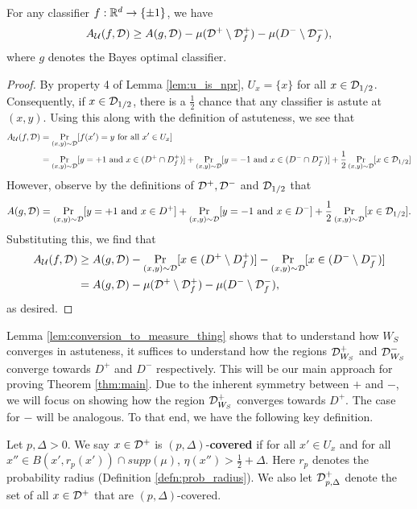 \begin{lem}\label{lem:conversion_to_measure_thing}
For any classifier $f: \mathbb R^d \to \{\pm 1\}$, we have $$A_{\mathcal U}(f, {\mathcal D}) \geq A(g, {\mathcal D}) - \mu({\mathcal D}^+ \setminus {\mathcal D}_f^+) - \mu(D^- \setminus {\mathcal D}_f^-),$$ where $g$ denotes the Bayes optimal classifier.
\end{lem}

\begin{proof}
By property 4 of Lemma \ref{lem:u_is_npr}, $U_x = \{x\}$ for all $x \in {\mathcal D}_{1/2}$. Consequently, if $x \in {\mathcal D}_{1/2}$, there is a $\frac{1}{2}$ chance that any classifier is astute at $(x,y)$. Using this along with the definition of astuteness, we see that 
\begin{equation*}
\begin{split}
A_{\mathcal U}(f, {\mathcal D}) &= \Pr_{(x,y) \sim {\mathcal D}} [f(x') = y\text{ for all }x' \in U_x] \\
&= \Pr_{(x,y) \sim {\mathcal D}}[y = +1\text{ and }x \in (D^+ \cap D_f^+)] + \Pr_{(x,y) \sim {\mathcal D}}[y = -1\text{ and }x \in (D^- \cap D_f^-)] + \frac{1}{2}\Pr_{(x,y) \sim {\mathcal D}}[x \in {\mathcal D}_{1/2}]
\end{split}
\end{equation*}
However, observe by the definitions of ${\mathcal D}^+, {\mathcal D}^-$ and ${\mathcal D}_{1/2}$ that $$A(g, {\mathcal D}) = \Pr_{(x,y) \sim {\mathcal D}}[y = +1\text{ and }x \in D^+] + \Pr_{(x,y) \sim {\mathcal D}}[y = -1\text{ and }x \in D^-] + \frac{1}{2}\Pr_{(x,y) \sim {\mathcal D}}[x \in {\mathcal D}_{1/2}].$$ Substituting this, we find that 
\begin{equation*}
\begin{split}
A_{\mathcal U}(f, {\mathcal D}) &\geq A(g, {\mathcal D}) - \Pr_{(x,y) \sim {\mathcal D}}[x \in (D^+ \setminus D_f^+)] - \Pr_{(x,y) \sim {\mathcal D}}[x \in (D^- \setminus D_f^-)] \\
&= A(g, {\mathcal D}) - \mu({\mathcal D}^+ \setminus {\mathcal D}_f^+) - \mu(D^- \setminus {\mathcal D}_f^-),
\end{split}
\end{equation*}
as desired. 
\end{proof}

Lemma \ref{lem:conversion_to_measure_thing} shows that to understand how $W_S$ converges in astuteness, it suffices to understand how the regions ${\mathcal D}_{W_S}^+$ and ${\mathcal D}_{W_S}^-$ converge towards $D^+$ and $D^-$ respectively. This will be our main approach for proving Theorem \ref{thm:main}. Due to the inherent symmetry between $+$ and $-$, we will focus on showing how the region ${\mathcal D}_{W_S}^+$ converges towards $D^+$. The case for $-$ will be analogous. To that end, we have the following key definition. 

\begin{defn}\label{defn:covered}
Let $p, \Delta > 0.$ We say $x \in {\mathcal D}^+$ is $(p, \Delta)$-\textbf{covered} if for all $x' \in U_x$ and for all $x'' \in B(x', r_p(x')) \cap supp(\mu)$, $\eta(x'') > \frac{1}{2} + \Delta.$ Here $r_p$ denotes the probability radius (Definition \ref{defn:prob_radius}). We also let ${\mathcal D}_{p, \Delta}^+$ denote the set of all $x \in {\mathcal D}^+$ that are $(p, \Delta)$-covered. 
\end{defn}


